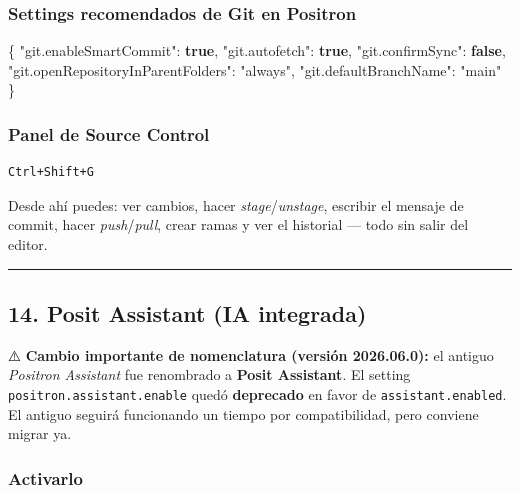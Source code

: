 \documentclass[
  doc,
  floatsintext,
  longtable,
  a4paper,
  nolmodern,
  notxfonts,
  notimes,
  12pt,
  colorlinks=true,linkcolor=blue,citecolor=blue,urlcolor=blue]{apa7}
\newenvironment{Shaded}{\begin{snugshade}}{\end{snugshade}}
\newcommand{\DataTypeTok}[1]{\textcolor[rgb]{0.68,0.00,0.00}{#1}}
\newcommand{\FunctionTok}[1]{\textcolor[rgb]{0.28,0.35,0.67}{#1}}
\newcommand{\KeywordTok}[1]{\textcolor[rgb]{0.00,0.23,0.31}{\textbf{#1}}}
\newcommand{\StringTok}[1]{\textcolor[rgb]{0.13,0.47,0.30}{#1}}
\begin{document}
\subsubsection{Settings recomendados de Git en
Positron}\label{settings-recomendados-de-git-en-positron}

\begin{Shaded}
\begin{Highlighting}[]
\FunctionTok{\{}
  \DataTypeTok{"git.enableSmartCommit"}\FunctionTok{:} \KeywordTok{true}\FunctionTok{,}
  \DataTypeTok{"git.autofetch"}\FunctionTok{:} \KeywordTok{true}\FunctionTok{,}
  \DataTypeTok{"git.confirmSync"}\FunctionTok{:} \KeywordTok{false}\FunctionTok{,}
  \DataTypeTok{"git.openRepositoryInParentFolders"}\FunctionTok{:} \StringTok{"always"}\FunctionTok{,}
  \DataTypeTok{"git.defaultBranchName"}\FunctionTok{:} \StringTok{"main"}
\FunctionTok{\}}
\end{Highlighting}
\end{Shaded}

\subsubsection{Panel de Source Control}\label{panel-de-source-control}

\begin{verbatim}
Ctrl+Shift+G
\end{verbatim}

Desde ahí puedes: ver cambios, hacer \emph{stage}/\emph{unstage},
escribir el mensaje de commit, hacer \emph{push}/\emph{pull}, crear
ramas y ver el historial --- todo sin salir del editor.

\begin{center}\rule{0.5\linewidth}{0.5pt}\end{center}

\subsection{14. Posit Assistant (IA
integrada)}\label{posit-assistant-ia-integrada}

⚠️ \textbf{Cambio importante de nomenclatura (versión 2026.06.0):} el
antiguo \emph{Positron Assistant} fue renombrado a \textbf{Posit
Assistant}. El setting \texttt{positron.assistant.enable} quedó
\textbf{deprecado} en favor de \texttt{assistant.enabled}. El antiguo
seguirá funcionando un tiempo por compatibilidad, pero conviene migrar
ya.

\subsubsection{Activarlo}\label{activarlo}
\end{document}

